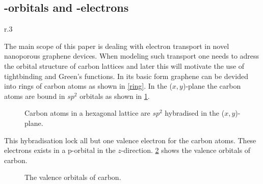 \subsection{\mathinhead{\pi}{\pi}-orbitals and \mathinhead{\pi}{\pi}-electrons}
\begin{wrapfigure}[7]{r}{.3\textwidth}
	\vspace{-2.3em}
	\centering
	\caption{Graphene lattices consists of hexagonal arrangements of carbon atoms.}\label{ring}
\end{wrapfigure}
The main scope of this paper is dealing with electron transport in novel nanoporous graphene devices.
When modeling such transport one needs to adress the orbital structure of carbon lattices and later this will motivate the use of tightbinding and Green's functions.
In its basic form graphene can be devided into rings of carbon atoms as shown in \cref{ring}. In the (\(x,y\))-plane the carbon atoms are bound in \(sp^2\) orbitals as shown in \cref{sp2}.
\begin{figure}[H]
  \centering
		\caption{Carbon atoms in a hexagonal lattice are \(sp^2\) hybradised in the (\(x,y\))-plane.}\label{sp2}
\end{figure}
This hybradisation lock all but one valence electron for the carbon atoms. These electrons exists in a p-orbital in the \(z\)-direction.
\cref{p} shows the valence orbitals of carbon.
\begin{figure}[H]
	\begin{center}
		\caption{The valence orbitals of carbon.}
		\label{p}
	\end{center}
\end{figure}
